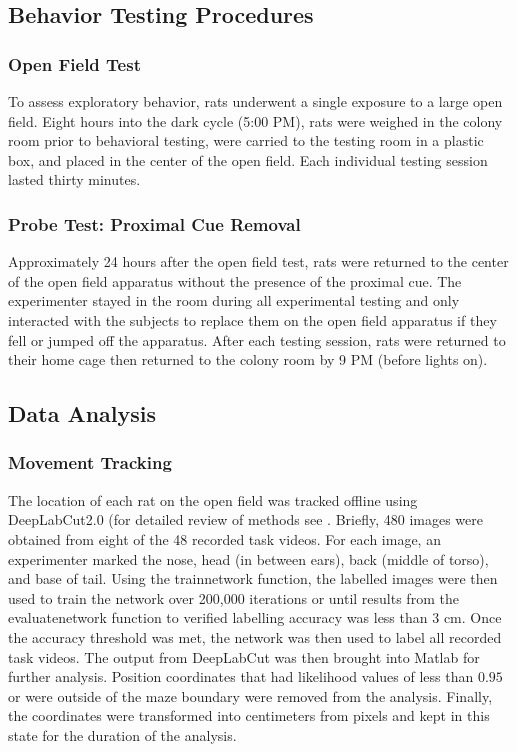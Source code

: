 \documentclass[fleqn,10pt]{wlscirep}
\begin{document}
\subsection*{Behavior Testing Procedures}

\subsubsection*{Open Field Test} To assess exploratory behavior, rats underwent a single exposure to a large open field. Eight hours into the dark cycle (5:00 PM), rats were weighed in the colony room prior to behavioral testing, were carried to the testing room in a plastic box, and placed in the center of the open field. Each individual testing session lasted thirty minutes. 

\subsubsection*{Probe Test: Proximal Cue Removal} Approximately 24 hours after the open field test, rats were returned to the center of the open field apparatus without the presence of the proximal cue. 
The experimenter stayed in the room during all experimental testing and only interacted with the subjects to replace them on the open field apparatus if they fell or jumped off the apparatus. After each testing session, rats were returned to their home cage then returned to the colony room by 9 PM (before lights on).

\subsection*{Data Analysis}
\subsubsection*{Movement Tracking}The location of each rat on the open field was tracked offline using DeepLabCut2.0 (for detailed review of methods see \cite{mathis_deeplabcut_2018}. Briefly, 480 images were obtained from eight of the 48 recorded task videos. For each image, an experimenter marked the nose, head (in between ears), back (middle of torso), and base of tail. Using the trainnetwork function, the labelled images were then used to train the network over 200,000 iterations or until results from the evaluatenetwork function to verified labelling accuracy was less than 3 cm. Once the accuracy threshold was met, the network was then used to label all recorded task videos. The output from DeepLabCut was then brought into Matlab for further analysis. Position coordinates that had likelihood values of less than $0.95$ or were outside of the maze boundary were removed from the analysis.
Finally, the coordinates were transformed into centimeters from pixels and kept in this state for the duration of the analysis. 
\end{document}
